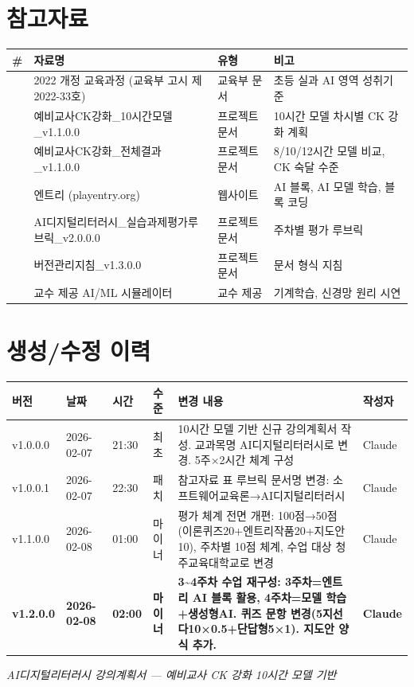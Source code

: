 \documentclass[a4paper,11pt]{article}
\begin{document}
\section*{참고자료}

{\small\noindent
\begin{tabularx}{\textwidth}{|>{\centering\arraybackslash}p{0.5cm}|X|p{2.3cm}|X|}
\hline
\textbf{\#} & \textbf{자료명} & \textbf{유형} & \textbf{비고} \\ \hline
1 & 2022 개정 교육과정 (교육부 고시 제2022-33호) & 교육부 문서 & 초등 실과 AI 영역 성취기준 \\ \hline
2 & 예비교사CK강화\_10시간모델\_v1.1.0.0 & 프로젝트 문서 & 10시간 모델 차시별 CK 강화 계획 \\ \hline
3 & 예비교사CK강화\_전체결과\_v1.1.0.0 & 프로젝트 문서 & 8/10/12시간 모델 비교, CK 숙달 수준 \\ \hline
4 & 엔트리 (playentry.org) & 웹사이트 & AI 블록, AI 모델 학습, 블록 코딩 \\ \hline
5 & AI디지털리터러시\_실습과제평가루브릭\_v2.0.0.0 & 프로젝트 문서 & 주차별 평가 루브릭 \\ \hline
6 & 버전관리지침\_v1.3.0.0 & 프로젝트 문서 & 문서 형식 지침 \\ \hline
7 & 교수 제공 AI/ML 시뮬레이터 & 교수 제공 & 기계학습, 신경망 원리 시연 \\ \hline
\end{tabularx}
}

\section*{생성/수정 이력}

{\scriptsize\noindent
\begin{tabularx}{\textwidth}{|p{1.2cm}|p{1.5cm}|p{0.8cm}|p{1cm}|X|p{0.8cm}|}
\hline
\textbf{버전} & \textbf{날짜} & \textbf{시간} & \textbf{수준} & \textbf{변경 내용} & \textbf{작성자} \\ \hline
v1.0.0.0 & 2026-02-07 & 21:30 & 최초 & 10시간 모델 기반 신규 강의계획서 작성. 교과목명 AI디지털리터러시로 변경. 5주×2시간 체계 구성 & Claude \\ \hline
v1.0.0.1 & 2026-02-07 & 22:30 & 패치 & 참고자료 표 루브릭 문서명 변경: 소프트웨어교육론→AI디지털리터러시 & Claude \\ \hline
v1.1.0.0 & 2026-02-08 & 01:00 & 마이너 & 평가 체계 전면 개편: 100점→50점(이론퀴즈20+엔트리작품20+지도안10), 주차별 10점 체계, 수업 대상 청주교육대학교로 변경 & Claude \\ \hline
\textbf{v1.2.0.0} & \textbf{2026-02-08} & \textbf{02:00} & \textbf{마이너} & \textbf{3\textasciitilde{}4주차 수업 재구성: 3주차=엔트리 AI 블록 활용, 4주차=모델 학습+생성형AI. 퀴즈 문항 변경(5지선다10×0.5+단답형5×1). 지도안 양식 추가.} & \textbf{Claude} \\ \hline
\end{tabularx}
}

\vspace{2em}
\begin{center}
\textit{AI디지털리터러시 강의계획서 --- 예비교사 CK 강화 10시간 모델 기반}
\end{center}
\end{document}
